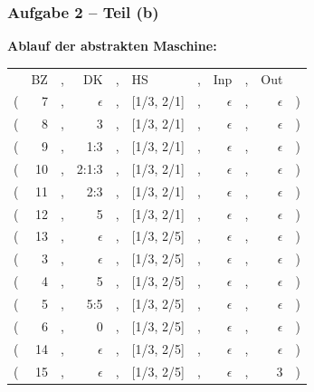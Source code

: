 \documentclass{beamer}
\renewcommand{\emph}[1]{\textbf{#1}}
\begin{document}
\begin{frame} \frametitle{Aufgabe 2 -- Teil (b)}
	\emph{Ablauf der abstrakten Maschine:} 
	\small
	\begin{center}
		\begin{tabular}{rrcrclcrcrl}
			& BZ &,& DK &,& HS &,& Inp &,& Out & \\
			( & 7 &,& $\epsilon$ &,& [1/3, 2/1] &,& $\epsilon$ &,& $\epsilon$ & ) \\
			( & 8 &,& 3 &,& [1/3, 2/1] &,& $\epsilon$ &,& $\epsilon$ & ) \\
			( & 9 &,& 1:3 &,& [1/3, 2/1] &,& $\epsilon$ &,& $\epsilon$ & ) \\
			( & 10 &,& 2:1:3 &,& [1/3, 2/1] &,& $\epsilon$ &,& $\epsilon$ & ) \\
			( & 11 &,& 2:3 &,& [1/3, 2/1] &,& $\epsilon$ &,& $\epsilon$ & ) \\
			( & 12 &,& 5 &,& [1/3, 2/1] &,& $\epsilon$ &,& $\epsilon$ & ) \\
			( & 13 &,& $\epsilon$ &,& [1/3, 2/5] &,& $\epsilon$ &,& $\epsilon$ & ) \\
			( & 3 &,& $\epsilon$ &,& [1/3, 2/5] &,& $\epsilon$ &,& $\epsilon$ & ) \\
			( & 4 &,& 5 &,& [1/3, 2/5] &,& $\epsilon$ &,& $\epsilon$ & ) \\
			( & 5 &,& 5:5 &,& [1/3, 2/5] &,& $\epsilon$ &,& $\epsilon$ & ) \\
			( & 6 &,& 0 &,& [1/3, 2/5] &,& $\epsilon$ &,& $\epsilon$ & ) \\
			( & 14 &,& $\epsilon$ &,& [1/3, 2/5] &,& $\epsilon$ &,& $\epsilon$ & ) \\
			( & 15 &,& $\epsilon$ &,& [1/3, 2/5] &,& $\epsilon$ &,& 3 & ) \\
		\end{tabular}
	\end{center}
\end{frame}
\end{document}
